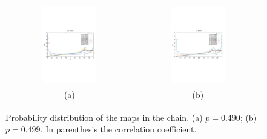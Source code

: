 \documentclass[runningheads]{llncs}
\begin{document}
\begin{figure}
    \centering
    \begin{tabular}{c c}
    \includegraphics[width=0.45\textwidth]{logisticchain-distr-p=0.490.pdf} & 
     \includegraphics[width=0.45\textwidth]{logisticchain-distr-p=0.499.pdf}\\
     (a) & (b) \\
    \end{tabular}  
    \caption{Probability distribution of the maps in the chain. (a) $p=0.490$; (b) $p=0.499$. In parenthesis the correlation coefficient.}
    \label{fig:logistic_distrib_chain}   
\end{figure}
\end{document}
